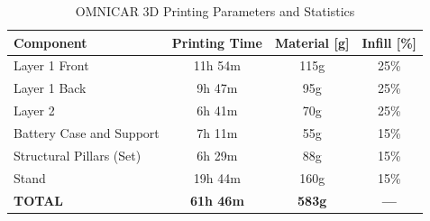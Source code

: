 \begin{table}[H]
\centering
\caption{OMNICAR 3D Printing Parameters and Statistics}
\label{tab:printing_stats}
\begin{tabularx}{\textwidth}{X c c c}
\toprule
\textbf{Component} & \textbf{Printing Time} & \textbf{Material [g]} & \textbf{Infill [\%]} \\ 
\midrule
Layer 1 Front               & 11h 54m & 115g & 25\% \\
Layer 1 Back                & 9h 47m  & 95g  & 25\% \\
Layer 2                     & 6h 41m  & 70g  & 25\% \\
Battery Case and Support    & 7h 11m  & 55g  & 15\% \\
Structural Pillars (Set)    & 6h 29m  & 88g  & 15\% \\
Stand                       & 19h 44m & 160g & 15\% \\
\midrule
\textbf{TOTAL}              & \textbf{61h 46m} & \textbf{583g} & \textbf{---} \\
\bottomrule
\end{tabularx}
\end{table}


